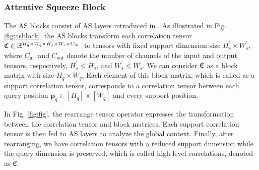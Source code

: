 \documentclass{ieeeaccess}
\begin{document}
\subsubsection{Attentive Squeeze Block}
The AS blocks consist of AS layers introduced in \cite{Kang2022}. As illustrated in Fig. \ref{fig:asblock}, the AS blocks transform each correlation tensor $\textbf{\mathfrak{C}} \in \mathbb{R}^{H_{q} \times W_{q} \times H_{s} \times W_{s} \times C_{\text {in }}}$ to tensors with fixed support dimension size $H^{'}_{s} \times W^{'}_{s}$, where $C_{\text {in }}$ and $C_{\text {out}}$ denote the number of channels of the input and output tensors, respectively, $H_{s}^{'} \leq H_{s}$, and $W_{s}^{'} \leq W_{s}$. We can consider $\textbf{\mathfrak{C}}$ as a block matrix with size $H_{q} \times W_{q}$, Each element of this block matrix, which is called as a support correlation tensor, corresponds to a correlation tensor between each query position $\mathbf{p}_q \in [H_{q}] \times [W_{q}]$ and every support position. 

In Fig. \ref{fig:fig}, the rearrange tensor operator expresses the transformation between the correlation tensor and block matrices. Each support correlation tensor is then fed to AS layers to analyze the global context. Finally, after rearranging, we have correlation tensors with a reduced support dimension while the query dimension is preserved, which is called high-level correlations, denoted as  $\mathbf{\ddot{\mathfrak{C}}}$.
\end{document}
